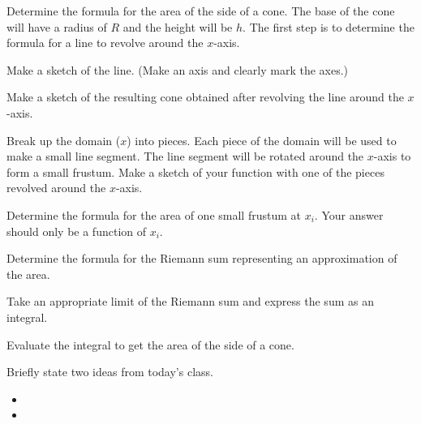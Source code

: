 \begin{problem}
  \item Determine the formula for the area of the side of a cone.
      The base of the cone will have a radius of $R$ and the height will be $h$.
      The first step is to determine the formula for a line to revolve around the $x$-axis.
  \begin{subproblem}
    \item Make a sketch of the line. (Make an axis and clearly mark the
      axes.)
      \vfill

    \item Make a sketch of the resulting cone obtained after
      revolving the line around the $x$-axis.
      \vfill

    \item Break up the domain ($x$) into pieces. Each piece of the domain will be used to make a small line segment.
         The line segment will be rotated around the $x$-axis to form a small frustum.
         Make a sketch of your function with one of the pieces revolved around the $x$-axis.
      \vfill

    \clearpage

    \item Determine the formula for the area of one small frustum at $x_i$. Your answer should only be a function of $x_i$.
      \vfill

    \item Determine the formula for the Riemann sum representing an approximation of the area.
      \vfill

    \item Take an appropriate limit of the Riemann sum and express the sum as an integral.
      \vfill

    \item Evaluate the integral to get the area of the side of a cone.
      \vfill



  \end{subproblem}
\end{problem}

\postClass

\begin{problem}
\item Briefly state two ideas from today's class.
  \begin{itemize}
  \item
  \item
  \end{itemize}
\item
  \begin{subproblem}
    \item
  \end{subproblem}
\end{problem}


